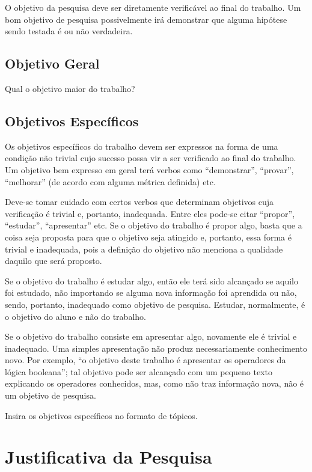 \documentclass[
	12pt,				    %
	openright,			    %
	oneside,			    %
	a4paper,			    %
    sumario=tradicional,        %
	english,			    %
	brazil,				    %
 ]{abntex2}
\begin{document}
O objetivo da pesquisa deve ser diretamente verificável ao final do trabalho. Um bom objetivo de pesquisa possivelmente irá demonstrar que alguma hipótese sendo testada é ou não verdadeira.

\subsection{Objetivo Geral}\label{sec:ObjGeral}

Qual o objetivo maior do trabalho?

\subsection{Objetivos Específicos}\label{sec:ObjEspec}

Os objetivos específicos do trabalho devem ser expressos na forma de uma condição não trivial cujo sucesso possa vir a ser verificado ao final do trabalho. Um objetivo bem expresso em geral terá verbos como “demonstrar”, “provar”, “melhorar” (de acordo com alguma métrica definida) etc.

Deve-se tomar cuidado com certos verbos que determinam objetivos cuja verificação é trivial e, portanto, inadequada. Entre eles pode-se citar “propor”, “estudar”, “apresentar” etc. Se o objetivo do trabalho é propor algo, basta que a coisa seja proposta para que o objetivo seja atingido e, portanto, essa forma é trivial e inadequada, pois a definição do objetivo não menciona a qualidade daquilo que será proposto.

Se o objetivo do trabalho é estudar algo, então ele terá sido alcançado se aquilo foi estudado, não importando se alguma nova informação foi aprendida ou não, sendo, portanto, inadequado como objetivo de pesquisa. Estudar, normalmente, é o objetivo do aluno e não do trabalho.

Se o objetivo do trabalho consiste em apresentar algo, novamente ele é trivial e inadequado. Uma simples apresentação não produz necessariamente conhecimento novo. Por exemplo, “o objetivo deste trabalho é apresentar os operadores da lógica booleana”; tal objetivo pode ser alcançado com um pequeno texto explicando os operadores conhecidos, mas, como não traz informação nova, não é um objetivo de pesquisa.

Insira os objetivos específicos no formato de tópicos.

\section{Justificativa da Pesquisa}\label{sec:Justificativa}
\end{document}
